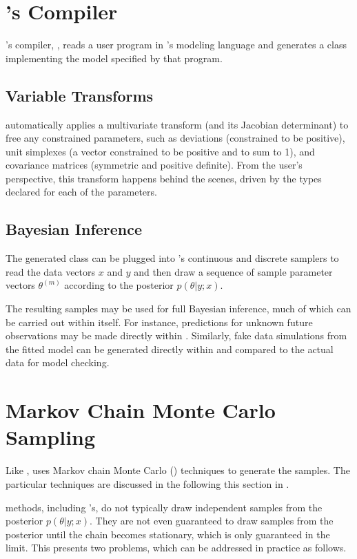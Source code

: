 \section{\Stan's Compiler}

\Stan's compiler, \stanc, reads a user program in \Stan's modeling
language and generates a \Cpp class implementing the model specified
by that program.  

\subsection{Variable Transforms}

\Stan automatically applies a multivariate transform (and its Jacobian
determinant) to free any constrained parameters, such as deviations
(constrained to be positive), unit simplexes (a vector constrained to
be positive and to sum to 1), and covariance matrices (symmetric and
positive definite).  From the user's perspective, this 
transform happens behind the scenes, driven by the types declared for 
each of the parameters. 

\subsection{Bayesian Inference}

The generated \Cpp class can be plugged into \Stan's continuous and
discrete samplers to read the data vectors $x$ and $y$ and then draw a
sequence of sample parameter vectors $\theta^{(m)}$ according to the
posterior $p(\theta|y;x)$.  

The resulting samples may be used for full Bayesian inference, much of
which can be carried out within \Stan itself.  For instance,
predictions for unknown future observations may be made directly
within \Stan.  Similarly, fake data simulations from the fitted model
can be generated directly within \Stan and compared to the actual data
for model checking.

\section{Markov Chain Monte Carlo Sampling}

Like \BUGS, \Stan uses Markov chain Monte Carlo (\MCMC) techniques to
generate the samples.  The particular techniques are discussed in the
following this section in .

\MCMC methods, including \Stan's, do not typically draw independent
samples from the posterior $p(\theta|y;x)$.  They are not even
guaranteed to draw samples from the posterior until the chain becomes
stationary, which is only guaranteed in the limit.  This presents two
problems, which can be addressed in practice as follows.

